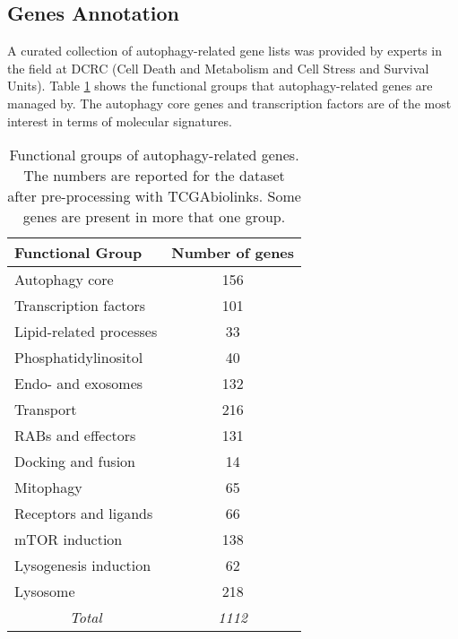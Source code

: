     \subsection{Genes Annotation}   
    A curated collection of autophagy-related gene lists was provided by experts in the field at DCRC (Cell Death and Metabolism and Cell Stress and Survival Units). Table \ref{table:autophagy} shows the functional groups that autophagy-related genes are managed by. The autophagy core genes and transcription factors are of the most interest in terms of molecular signatures. 
    
    
            \begin{table}[!htbp]
            \centering
            \caption{Functional groups of autophagy-related genes. The numbers are reported for the dataset after pre-processing with TCGAbiolinks. Some genes are present in more that one group. }
            \label{table:autophagy}
            \begin{tabular}{l|c}
            \small
            \textbf{Functional Group} & \multicolumn{1}{l}{\textbf{Number of genes}} \\ \hline
            Autophagy core & 156 \\ \hline
            Transcription factors & 101 \\ \hline
            Lipid-related processes & 33 \\ \hline
            Phosphatidylinositol & 40 \\ \hline
            Endo- and exosomes & 132 \\ \hline
            Transport & 216 \\ \hline
            RABs and effectors & 131 \\ \hline
            Docking and fusion & 14 \\ \hline
            Mitophagy & 65 \\ \hline
            Receptors and ligands & 66 \\ \hline
            mTOR induction & 138 \\ \hline
            Lysogenesis induction & 62 \\ \hline
            Lysosome & 218 \\ \hline
            \multicolumn{1}{c|}{\textit{Total}} & \textit{1112}
            \end{tabular}
            \end{table}
            
            
            

